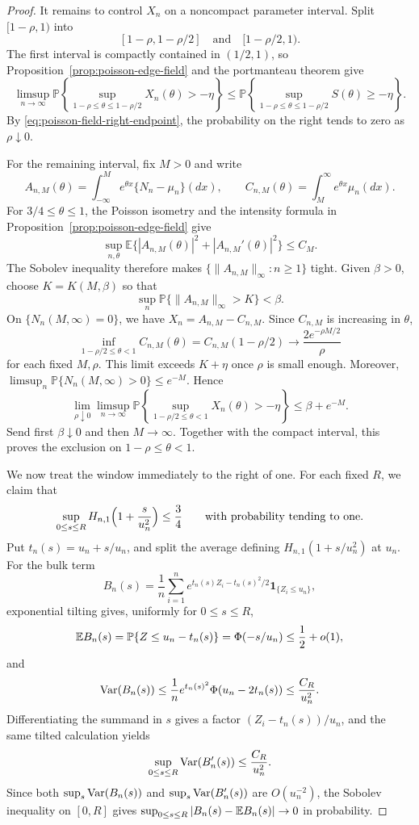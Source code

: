 \begin{proof}
It remains to control \(X_n\) on a noncompact parameter interval. Split
\([1-\rho,1)\) into
\[
 [1-\rho,1-\rho/2]\quad\text{and}\quad[1-\rho/2,1).
\]
The first interval is compactly contained in \((1/2,1)\), so
Proposition~\ref{prop:poisson-edge-field} and the portmanteau theorem give
\[
 \limsup_{n\to\infty}
 \mathbb P\left\{
   \sup_{1-\rho\le\theta\le1-\rho/2}X_n(\theta)>-\eta
 \right\}
 \le
 \mathbb P\left\{
   \sup_{1-\rho\le\theta\le1-\rho/2}S(\theta)\ge-\eta
 \right\}.
\]
By \eqref{eq:poisson-field-right-endpoint}, the probability on the right
tends to zero as \(\rho\downarrow0\).

For the remaining interval, fix \(M>0\) and write
\[
 A_{n,M}(\theta)
 =
 \int_{-\infty}^M e^{\theta x}\{N_n-\mu_n\}(dx),
 \qquad
 C_{n,M}(\theta)
 =
 \int_M^\infty e^{\theta x}\mu_n(dx).
\]
For \(3/4\le\theta\le1\), the Poisson isometry and the intensity formula in
Proposition~\ref{prop:poisson-edge-field} give
\[
 \sup_{n,\theta}\mathbb E\{|A_{n,M}(\theta)|^2
       +|A_{n,M}'(\theta)|^2\}
 \le C_M.
\]
The Sobolev inequality therefore makes
\(\{\|A_{n,M}\|_\infty:n\ge1\}\) tight. Given
\(\beta>0\), choose \(K=K(M,\beta)\) so that
\[
 \sup_n\mathbb P\{\|A_{n,M}\|_\infty>K\}<\beta.
\]
On \(\{N_n(M,\infty)=0\}\), we have
\(X_n=A_{n,M}-C_{n,M}\). Since \(C_{n,M}\) is increasing in \(\theta\),
\[
 \inf_{1-\rho/2\le\theta<1}C_{n,M}(\theta)
 =
 C_{n,M}(1-\rho/2)
 \longrightarrow
 \frac{2e^{-\rho M/2}}{\rho}
\]
for each fixed \(M,\rho\). This limit exceeds \(K+\eta\) once \(\rho\) is
small enough. Moreover,
\(\limsup_n\mathbb P\{N_n(M,\infty)>0\}\le e^{-M}\). Hence
\[
 \lim_{\rho\downarrow0}\limsup_{n\to\infty}
 \mathbb P\left\{
  \sup_{1-\rho/2\le\theta<1}X_n(\theta)>-\eta
 \right\}
 \le \beta+e^{-M}.
\]
Send first \(\beta\downarrow0\) and then \(M\to\infty\). Together with the
compact interval, this proves the exclusion on \(1-\rho\le\theta<1\).

We now treat the window immediately to the right of one. For each fixed
$R$, we claim that
\[
    \sup_{0\le s\le R}
    H_{n,1}\Bigl(1+\frac{s}{u_n^2}\Bigr)
    \le
    \frac34
    \qquad\text{with probability tending to one}.
\]
Put $t_n(s)=u_n+s/u_n$, and split the average defining $H_{n,1}(1+s/u_n^2)$ at $u_n$. For the bulk term
\[
    B_n(s)
    =
    \frac1n\sum_{i=1}^n
    e^{t_n(s)Z_i-t_n(s)^2/2}
    \mathbf 1_{\{Z_i\le u_n\}},
\]
exponential tilting gives, uniformly for $0\le s\le R$,
\[
    \mathbb{E} B_n(s)
    =
    \mathbb P\{Z\le u_n-t_n(s)\}
    =
    \Phi(-s/u_n)
    \le
    \frac12+o(1),
\]
and
\[
    \operatorname{Var}(B_n(s))
    \le
    \frac1n e^{t_n(s)^2}\Phi(u_n-2t_n(s))
    \le
    \frac{C_R}{u_n^2}.
\]
Differentiating the summand in $s$ gives a factor $(Z_i-t_n(s))/u_n$, and the same tilted calculation yields
\[
    \sup_{0\le s\le R}\operatorname{Var}(B_n'(s))
    \le
    \frac{C_R}{u_n^2}.
\]
Since both \(\sup_s\operatorname{Var}(B_n(s))\) and \(\sup_s\operatorname{Var}(B_n'(s))\) are \(O(u_n^{-2})\), the Sobolev inequality on \([0,R]\) gives \(\sup_{0\le s\le R}|B_n(s)-\mathbb{E} B_n(s)|\to0\) in probability.


\end{proof}
